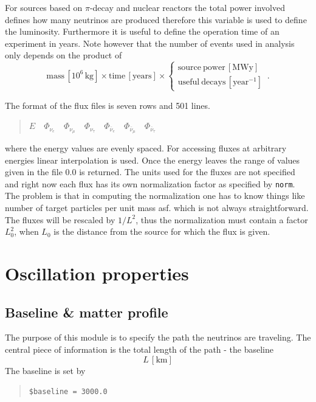 For sources based on $\pi$-decay and nuclear reactors the total power
involved defines how many neutrinos are produced therefore this variable is
used to define the luminosity. Furthermore it is useful to define 
the operation time of an experiment in years. Note however that the 
number of events used in analysis only depends on the product of
\begin{equation}
\mathrm{mass}\,\left[10^6\,\mathrm{kg}\right]\times \mathrm{time}
\,\left[\mathrm{years}\right]\times\left\{ \begin{array}{c}
\mathrm{source~power}\,\left[\mathrm{MWy}\right]\\
\mathrm{useful~decays}\,\left[\mathrm{year}^{-1}\right]
\end{array}\right.\,.
\end{equation}

The format of the flux files is seven rows and
501 lines.
\begin{quotation}
$ E\quad
\Phi_{\nu_e}\quad
\Phi_{\nu_\mu}\quad
\Phi_{\nu_\tau}\quad
\Phi_{\bar\nu_e}\quad
\Phi_{\bar\nu_\mu}\quad
\Phi_{\bar\nu_\tau}$
\end{quotation}
where the energy values are evenly spaced. 
For accessing fluxes at 
arbitrary energies linear interpolation is used. Once the energy leaves the
range of values given in the file $0.0$ is returned. The units used for the
fluxes are not specified and right now each flux has its own normalization 
factor as specified by {\tt norm}. The problem is that
in computing the normalization one has to know things like number of target
particles per unit mass asf. which is not always straightforward. The fluxes
will be rescaled by $1/L^2$, thus the normalization must contain a factor
$L_0^2$, when $L_0$ is the distance from the source for which the flux is
given.
\section{Oscillation properties}



\subsection{Baseline \& matter profile}
The purpose of this module is to specify the path the neutrinos
are traveling. The central piece of information is the total length
of the path - the baseline
\begin{equation}
L\,\left[\mathrm{km}\right]
\end{equation} 
The baseline is set by 
\begin{quote}
{\tt \$baseline = 3000.0 }
\end{quote}




